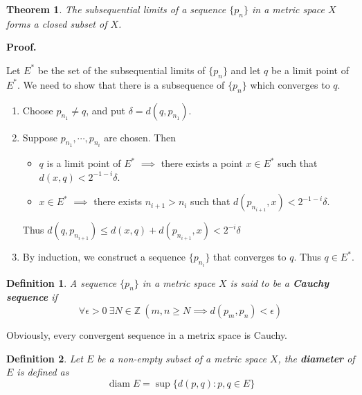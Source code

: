 \documentclass[aps,pra,onecolumn,notitlepage,superscriptaddress]{revtex4-1}
\newcommand{\Z}{\mathbb{Z}}
\newcommand{\op}[1]{\operatorname{#1}}
\newtheorem{theo}{Theorem}
\newtheorem{defi}{Definition}
\def\Proof{{\bf Proof.~}}
\begin{document}
    \begin{theo}
        The subsequential limits of a sequence $\{p_n\}$ in a metric space $X$ forms a closed subset of $X$.
    \end{theo}
    \begin{framed}
        \Proof {
            Let $E^*$ be the set of the subsequential limits of $\{p_n\}$ and let $q$ be a limit point of $E^*$. We need to show that there is a subsequence of $\{p_n\}$ which converges to $q$.

            \begin{enumerate}
                \item Choose $p_{n_1} \neq q$, and put $\delta = d(q, p_{n_1})$.

                \item Suppose $p_{n_1}, \cdots, p_{n_i}$ are chosen. Then 
            \begin{itemize}
                \item $q$ is a limit point of $E^*$ $\implies$ there exists a point $x \in E^*$ such that $d(x, q) < 2^{-1-i} \delta$.
                \item $x \in E^*$ $\implies$ there exists $n_{i+1} > n_{i}$ such that $d(p_{n_{i+1}}, x) < 2^{-1-i} \delta$.
            \end{itemize}
            
            Thus $d(q, p_{n_{i+1}}) \leq d(x,q)+d(p_{n_{i+1}}, x) < 2^{-i} \delta$

            \item By induction, we construct a sequence $\{p_{n_{i}} \}$ that converges to $q$. Thus $q \in E^*$.
            \end{enumerate}
        }
    \end{framed}

    \begin{defi}
        A sequence $\{p_n\}$ in a metric space $X$ is said to be a \textbf{Cauchy sequence} if 
        \begin{equation}
            \forall \epsilon > 0 \ \exists N \in \Z \ (m,n \geq N \implies d(p_m, p_n) < \epsilon)
        \end{equation}
    \end{defi}

    Obviously, every convergent sequence in a metrix space is Cauchy.

    \begin{defi}
        Let $E$ be a non-empty subset of a metric space $X$, the \textbf{diameter} of $E$ is defined as
        \begin{equation}
            \op{diam} E = \sup \{ d(p,q) : p, q \in E \}
        \end{equation}
    \end{defi}
\end{document}
